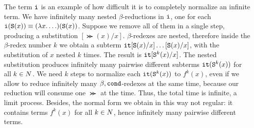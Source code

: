 The term ${\tt i}$ is an example of how difficult it is to completely normalize
an infinite term. We have infinitely many nested $\beta$-reductions in
${\tt i}$, one for each ${\tt i}({\tt S} (x)) \equiv (\lambda x.\ldots)({\tt S} (x))$. 
Suppose we remove all of them in a single step, producing a substitution
$[\Succ (x)/x]$. $\beta$-redexes are nested, therefore 
inside the $\beta$-redex number $k$ we obtain a subterm ${\tt it}[{\tt S} (x)/x]
\ldots[{\tt S} (x)/x]$, with the substitution of $x$ nested $k$ times. 
The result is ${\tt it}[{\tt S} ^k(x)/x]$.
The nested substitution produces infinitely many pairwise different subterms 
${\tt it}({\tt S} ^k(x))$ for all $k \in {N}$. 
We need $k$ steps to normalize each ${\tt it}({\tt S} ^k(x))$ to $f^k(x)$, 
even if we allow to reduce infinitely many 
$\beta, {\tt cond}$-redexes at the same time, because our reduction will consume one 
$\Succ$  at the time. Thus, the total time is infinite, a limit process. 
Besides, the normal form we obtain in this way not regular: it contains terms 
$f^k(x)$ for all $k \in {N}$, hence infinitely many pairwise different terms. 




